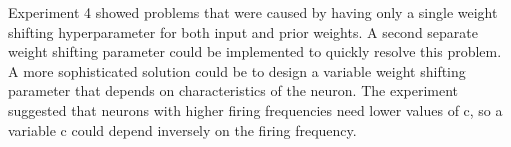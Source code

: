Experiment 4 showed problems that were caused by having only a single weight shifting hyperparameter for both input and prior weights. A second separate weight shifting parameter could be implemented to quickly resolve this problem. A more sophisticated solution could be to design a variable weight shifting parameter that depends on characteristics of the neuron. The experiment suggested that neurons with higher firing frequencies need lower values of c, so a variable c could depend inversely on the firing frequency.
